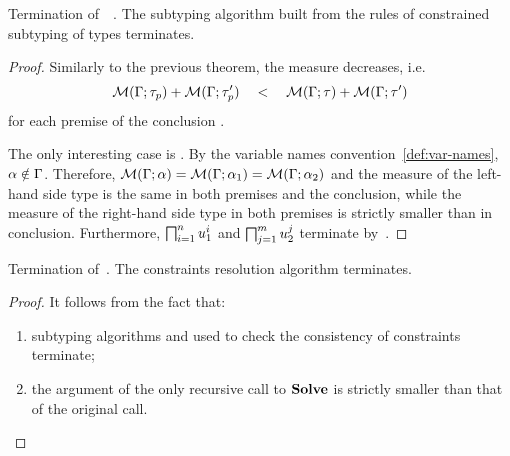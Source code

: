 \begin{theorem}{Termination of\ \ .}%
\label{thm:subtyctr-terminates}
    The subtyping algorithm built from the rules of
    constrained subtyping of types
     terminates.
\end{theorem}
\begin{proof}
    Similarly to the previous theorem, the measure decreases, i.e.
    \[\operatorname{\mathcal{M}}(\Gamma;\tau_p) + \operatorname{\mathcal{M}}(\Gamma;\tau'_p) \quad<\quad 
    \operatorname{\mathcal{M}}(\Gamma;\tau) + \operatorname{\mathcal{M}}(\Gamma;\tau')\]
    for each premise 
    of the conclusion .
    
    The only interesting case is .
    By the variable names convention~\ref{def:var-names}, $\alpha \notin \Gamma$.
    Therefore, $\operatorname{\mathcal{M}}(\Gamma;\alpha) = \operatorname{\mathcal{M}}(\Gamma;\alpha_1) = \operatorname{\mathcal{M}}(\Gamma;\alpha_2)$
    and the measure of the left-hand side type is the same in both premises
    and the conclusion,
    while the measure of the right-hand side type in both premises 
    is strictly smaller than in conclusion.
    Furthermore, $\textstyle\bigsqcap_{i=1}^n u_1^i$ and $\textstyle\bigsqcap_{j=1}^m u_2^j$
    terminate by~.
\end{proof}

\begin{theorem}{Termination of\ \solvectrdflt.}%
\label{thm:solvectr-terminates}
    The constraints resolution algorithm \solvectrdflt terminates.
\end{theorem}
\begin{proof}
    It follows from the fact that:
    \begin{enumerate}
        \item subtyping algorithms  and 
             used to check the consistency of 
            constraints terminate;
        \item the argument \UEnv of the only recursive call to $\operatorname{\mathbf{Solve}}$
            is strictly smaller than that of the original call.
    \end{enumerate} 
\end{proof}


